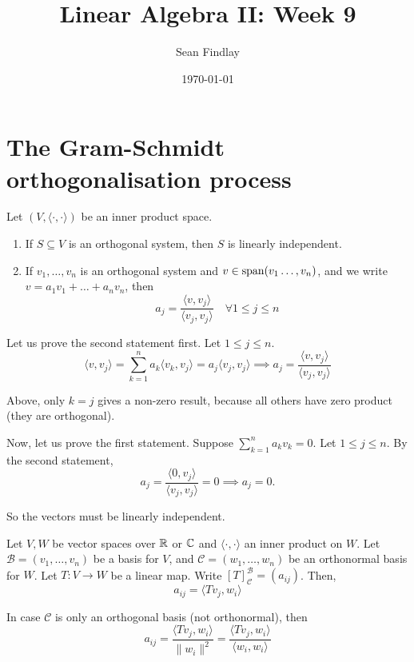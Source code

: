 \documentclass[12pt]{article}
\title{Linear Algebra II: Week 9}
\author{Sean Findlay}
\date{\today}
\begin{document}
\maketitle

\section{The Gram-Schmidt orthogonalisation process}

\begin{theorem}{}{}
    Let $(V, \langle \cdot, \cdot \rangle)$ be an inner product space.
    \begin{enumerate}
        \item If $S \subseteq V$ is an orthogonal system, then $S$ is linearly independent.
        \item If $v_1,\dots,v_n$ is an orthogonal system and $v \in \operatorname{span}(v_1\dots,v_n)$, and we write $v = a_1v_1 + \dots + a_nv_n$, then
        $$
            a_j = \frac{\langle v, v_j \rangle}{\langle v_j, v_j \rangle} \quad \forall 1 \leq j \leq n
        $$
    \end{enumerate}
\end{theorem}

\begin{proofbox}
    Let us prove the second statement first. Let $1 \leq j \leq n$.
    $$
        \langle v, v_j \rangle = \sum_{k = 1}^{n} a_k \langle v_k, v_j \rangle = a_j \langle v_j, v_j \rangle \implies a_j = \frac{\langle v, v_j \rangle}{\langle v_j, v_j \rangle}
    $$

    Above, only $k = j$ gives a non-zero result, because all others have zero product (they are orthogonal).

    Now, let us prove the first statement. Suppose $\sum_{k = 1}^{n} a_k v_k = 0$. Let $1 \leq j \leq n$. By the second statement,
    $$
        a_j = \frac{\langle 0, v_j \rangle}{\langle v_j, v_j \rangle} = 0 \implies a_j = 0.
    $$

    So the vectors must be linearly independent.
\end{proofbox}

\begin{proposition}{}{}
    Let $V, W$ be vector spaces over $\mathbb{R}$ or $\mathbb{C}$ and $\langle \cdot, \cdot \rangle$ an inner product on $W$. Let $\mathcal{B} = (v_1,\dots,v_n)$ be a basis for $V$, and $\mathcal{C} = (w_1,\dots,w_n)$ be an orthonormal basis for $W$. Let $T: V \rightarrow W$ be a linear map. Write $\left[T\right]_{\mathcal{C}}^{\mathcal{B}} = (a_{ij})$. Then,
    $$
        a_{ij} = \langle T v_j, w_i \rangle
    $$

    In case $\mathcal{C}$ is only an orthogonal basis (not orthonormal), then
    $$
        a_{ij} = \frac{\langle T v_j, w_i \rangle}{\lVert w_i \rVert^2} = \frac{\langle T v_j, w_i \rangle}{\langle w_i, w_i \rangle}
    $$
\end{proposition}
\end{document}

